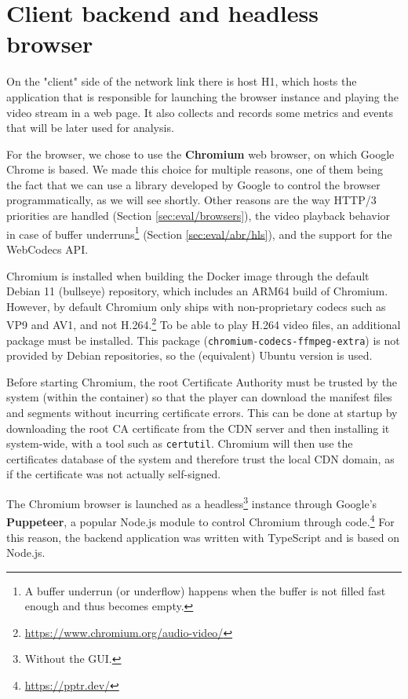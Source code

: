 \section{Client backend and headless browser}
\label{sec:testbed/backend}

On the "client" side of the network link there is host H1, which hosts the application that is responsible for launching the browser instance and playing the video stream in a web page. It also collects and records some metrics and events that will be later used for analysis.

For the browser, we chose to use the \textbf{Chromium} web browser, on which Google Chrome is based. We made this choice for multiple reasons, one of them being the fact that we can use a library developed by Google to control the browser programmatically, as we will see shortly. Other reasons are the way HTTP/3 priorities are handled (Section \ref{sec:eval/browsers}), the video playback behavior in case of buffer underruns\footnote{A buffer underrun (or underflow) happens when the buffer is not filled fast enough and thus becomes empty.} (Section \ref{sec:eval/abr/hls}), and the support for the WebCodecs API.

Chromium is installed when building the Docker image through the default Debian 11 (bullseye) repository, which includes an ARM64 build of Chromium. However, by default Chromium only ships with non-proprietary codecs such as VP9 and AV1, and not H.264.\footnote{\url{https://www.chromium.org/audio-video/}} To be able to play H.264 video files, an additional package must be installed. This package (\texttt{chromium-codecs-ffmpeg-extra}) is not provided by Debian repositories, so the (equivalent) Ubuntu version is used.

Before starting Chromium, the root Certificate Authority must be trusted by the system (within the container) so that the player can download the manifest files and segments without incurring certificate errors. This can be done at startup by downloading the root CA certificate from the CDN server and then installing it system-wide, with a tool such as \texttt{certutil}. Chromium will then use the certificates database of the system and therefore trust the local CDN domain, as if the certificate was not actually self-signed.

The Chromium browser is launched as a headless\footnote{Without the GUI.} instance through Google's \textbf{Puppeteer}, a popular Node.js module to control Chromium through code.\footnote{\url{https://pptr.dev/}} For this reason, the backend application was written with TypeScript and is based on Node.js.

